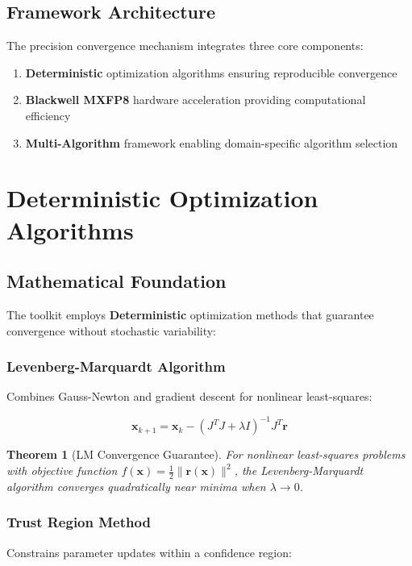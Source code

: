 \documentclass[11pt,a4paper]{article}
\newtheorem{theorem}{Theorem}[section]
\newcommand{\DETERMINISTIC}{\textcolor{deterministic}{\textbf{Deterministic}}}
\newcommand{\HARDWARE}{\textcolor{hardware}{\textbf{Blackwell MXFP8}}}
\newcommand{\MULTI}{\textcolor{multi}{\textbf{Multi-Algorithm}}}
\begin{document}
\subsection{Framework Architecture}

The precision convergence mechanism integrates three core components:

\begin{enumerate}
    \item \DETERMINISTIC{} optimization algorithms ensuring reproducible convergence
    \item \HARDWARE{} hardware acceleration providing computational efficiency
    \item \MULTI{} framework enabling domain-specific algorithm selection
\end{enumerate}

\section{Deterministic Optimization Algorithms}

\subsection{Mathematical Foundation}

The toolkit employs \DETERMINISTIC{} optimization methods that guarantee convergence without stochastic variability:

\subsubsection{Levenberg-Marquardt Algorithm}
Combines Gauss-Newton and gradient descent for nonlinear least-squares:

\[\mathbf{x}_{k+1} = \mathbf{x}_k - \left(J^T J + \lambda I\right)^{-1} J^T \mathbf{r}\]

\begin{theorem}[LM Convergence Guarantee]
For nonlinear least-squares problems with objective function $f(\mathbf{x}) = \frac{1}{2} \|\mathbf{r}(\mathbf{x})\|^2$, the Levenberg-Marquardt algorithm converges quadratically near minima when $\lambda \to 0$.
\end{theorem}

\subsubsection{Trust Region Method}
Constrains parameter updates within a confidence region:
\end{document}
